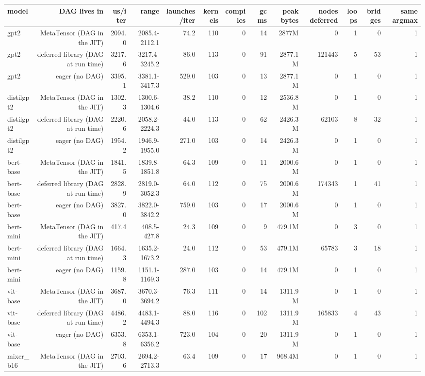 \begin{tabular}{lrrrrrrrrrrrr}
\toprule
model & DAG lives in & us/iter & range & launches/iter & kernels & compiles & gc ms & peak bytes & nodes deferred & loops & bridges & same argmax \\
\midrule
gpt2 & MetaTensor (DAG in the JIT) & 2094.0 & 2085.4-2112.1 & 74.2 & 110 & 0 & 14 & 2877M & 0 & 1 & 0 & 1 \\
gpt2 & deferred library (DAG at run time) & 3217.6 & 3217.4-3245.2 & 86.0 & 113 & 0 & 91 & 2877.1M & 121443 & 5 & 53 & 1 \\
gpt2 & eager (no DAG) & 3395.1 & 3381.1-3417.3 & 529.0 & 103 & 0 & 13 & 2877.1M & 0 & 1 & 0 & 1 \\
distilgpt2 & MetaTensor (DAG in the JIT) & 1302.3 & 1300.6-1304.6 & 38.2 & 110 & 0 & 12 & 2536.8M & 0 & 1 & 0 & 1 \\
distilgpt2 & deferred library (DAG at run time) & 2220.6 & 2058.2-2224.3 & 44.0 & 113 & 0 & 62 & 2426.3M & 62103 & 8 & 32 & 1 \\
distilgpt2 & eager (no DAG) & 1954.2 & 1946.9-1955.0 & 271.0 & 103 & 0 & 14 & 2426.3M & 0 & 1 & 0 & 1 \\
bert-base & MetaTensor (DAG in the JIT) & 1841.5 & 1839.8-1851.8 & 64.3 & 109 & 0 & 11 & 2000.6M & 0 & 1 & 0 & 1 \\
bert-base & deferred library (DAG at run time) & 2828.9 & 2819.0-3052.3 & 64.0 & 112 & 0 & 75 & 2000.6M & 174343 & 1 & 41 & 1 \\
bert-base & eager (no DAG) & 3827.0 & 3822.0-3842.2 & 759.0 & 103 & 0 & 17 & 2000.6M & 0 & 1 & 0 & 1 \\
bert-mini & MetaTensor (DAG in the JIT) & 417.4 & 408.5-427.8 & 24.3 & 109 & 0 & 9 & 479.1M & 0 & 3 & 0 & 1 \\
bert-mini & deferred library (DAG at run time) & 1664.3 & 1635.2-1673.2 & 24.0 & 112 & 0 & 53 & 479.1M & 65783 & 3 & 18 & 1 \\
bert-mini & eager (no DAG) & 1159.8 & 1151.1-1169.3 & 287.0 & 103 & 0 & 14 & 479.1M & 0 & 1 & 0 & 1 \\
vit-base & MetaTensor (DAG in the JIT) & 3687.0 & 3670.3-3694.2 & 76.3 & 111 & 0 & 14 & 1311.9M & 0 & 1 & 0 & 1 \\
vit-base & deferred library (DAG at run time) & 4486.2 & 4483.1-4494.3 & 88.0 & 116 & 0 & 102 & 1311.9M & 165833 & 4 & 43 & 1 \\
vit-base & eager (no DAG) & 6353.8 & 6353.1-6356.2 & 723.0 & 104 & 0 & 20 & 1311.9M & 0 & 1 & 0 & 1 \\
mixer\_b16 & MetaTensor (DAG in the JIT) & 2703.6 & 2694.2-2713.3 & 63.4 & 109 & 0 & 17 & 968.4M & 0 & 1 & 0 & 1 \\

\end{tabular}
